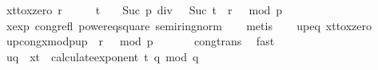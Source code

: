 \begin{isabellebody}
\ x{\isacharunderscore}{\kern0pt}t{\isacharunderscore}{\kern0pt}to{\isacharunderscore}{\kern0pt}x{\isacharunderscore}{\kern0pt}zero{\isacharcolon}{\kern0pt}\ {\isachardoublequoteopen}{\isacharbrackleft}{\kern0pt}{\isacharparenleft}{\kern0pt}{\isacharparenleft}{\kern0pt}r\ {\isacharcircum}{\kern0pt}\ {}{\isacharparenright}{\kern0pt}\ {\isacharcircum}{\kern0pt}\ {\isacharparenleft}{\kern0pt}{}\ {\isacharcircum}{\kern0pt}\ {\isacharparenleft}{\kern0pt}t\ {\isacharplus}{\kern0pt}\ {}{\isacharparenright}{\kern0pt}{\isacharparenright}{\kern0pt}{\isacharparenright}{\kern0pt}\ {\isacharcircum}{\kern0pt}\ {\isacharparenleft}{\kern0pt}{\isacharparenleft}{\kern0pt}{\isacharparenleft}{\kern0pt}Suc\ p{\isacharparenright}{\kern0pt}\ div\ {}{\isacharparenright}{\kern0pt}\ {\isacharcircum}{\kern0pt}\ {\isacharparenleft}{\kern0pt}Suc\ t{\isacharparenright}{\kern0pt}{\isacharparenright}{\kern0pt}\ {\isacharequal}{\kern0pt}\ r\ {\isacharcircum}{\kern0pt}\ {}{\isacharbrackright}{\kern0pt}\ {\isacharparenleft}{\kern0pt}mod\ p{\isacharparenright}{\kern0pt}{\isachardoublequoteclose}\isanewline
\ \ \ \ \isamarkupfalse%
\ x{\isacharunderscore}{\kern0pt}exp\ cong{\isacharunderscore}{\kern0pt}refl\ power{}{\isacharunderscore}{\kern0pt}eq{\isacharunderscore}{\kern0pt}square\ semiring{\isacharunderscore}{\kern0pt}norm{\isacharparenleft}{\kern0pt}{}{}{}{\isacharparenright}{\kern0pt}\isanewline
\ \ \isamarkupfalse%
\ {\isacharparenleft}{\kern0pt}metis{\isacharparenright}{\kern0pt}\isanewline
\isanewline
\ \ \isamarkupfalse%
\ up{\isacharunderscore}{\kern0pt}eq\ x{\isacharunderscore}{\kern0pt}t{\isacharunderscore}{\kern0pt}to{\isacharunderscore}{\kern0pt}x{\isacharunderscore}{\kern0pt}zero\ \isamarkupfalse%
\ up{\isacharunderscore}{\kern0pt}cong{\isacharunderscore}{\kern0pt}x{\isacharunderscore}{\kern0pt}mod{\isacharunderscore}{\kern0pt}p{\isacharcolon}{\kern0pt}{\isachardoublequoteopen}{\isacharbrackleft}{\kern0pt}{\isacharquery}{\kern0pt}up\ {\isacharequal}{\kern0pt}\ r\ {\isacharcircum}{\kern0pt}\ {}{\isacharbrackright}{\kern0pt}\ {\isacharparenleft}{\kern0pt}mod\ p{\isacharparenright}{\kern0pt}{\isachardoublequoteclose}\ \isanewline
\ \ \ \ \isamarkupfalse%
\ cong{\isacharunderscore}{\kern0pt}trans\ \isamarkupfalse%
\ fast\isanewline
\isanewline
\isanewline
\ \ \isamarkupfalse%
\ {\isachardoublequoteopen}{\isacharbrackleft}{\kern0pt}{\isacharquery}{\kern0pt}uq\ {\isacharequal}{\kern0pt}\ {\isacharquery}{\kern0pt}xt\ {\isacharcircum}{\kern0pt}\ {\isacharparenleft}{\kern0pt}calculate{\isacharunderscore}{\kern0pt}exponent\ t\ q{\isacharparenright}{\kern0pt}{\isacharbrackright}{\kern0pt}\ {\isacharparenleft}{\kern0pt}mod\ q{\isacharparenright}{\kern0pt}{\isachardoublequoteclose}\ \isamarkupfalse%

\end{isabellebody}
